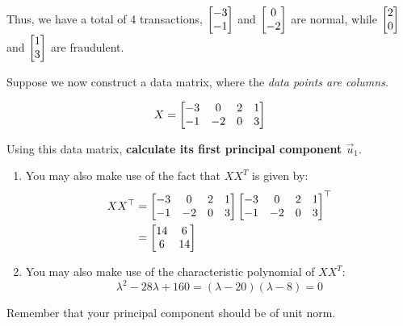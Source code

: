 	Thus, we have a total of 4 transactions, $\begin{bmatrix}-3 \\ -1\end{bmatrix}$ and $\begin{bmatrix}0 \\ -2\end{bmatrix}$ are normal, while $\begin{bmatrix}2 \\ 0\end{bmatrix}$ and $\begin{bmatrix}1 \\ 3\end{bmatrix}$ are fraudulent.
	\begin{enumerate}
		
		\qitem Suppose we now construct a data matrix, where the \textit{data points are columns}. 

			\begin{equation}
				X = \begin{bmatrix}-3 & 0 & 2 & 1 \\ -1 & -2 & 0 & 3\end{bmatrix}
			\end{equation}

			Using this data matrix, \textbf{calculate its first principal component $\vec{u}_1$}.

			\begin{hint}
			\begin{enumerate}

				\item You may also make use of the fact that $XX^T$ is given by:
				\begin{align}
					XX^{\top} &= \begin{bmatrix}-3 & 0 & 2 & 1 \\ -1 & -2 & 0 & 3\end{bmatrix}\begin{bmatrix}-3 & 0 & 2 & 1 \\ -1 & -2 & 0 & 3\end{bmatrix}^{\top} \\
						&= \begin{bmatrix}14 & 6 \\ 6 & 14\end{bmatrix}
				\end{align}
				\item You may also make use of the characteristic polynomial of $XX^T$:
				\begin{equation}
					\lambda^2 - 28\lambda + 160 = (\lambda - 20)(\lambda - 8) = 0
				\end{equation}
			\end{enumerate}
			\end{hint}
			
			\begin{hint} Remember that your principal component should be of unit norm. \end{hint}

		\ans{

}
\end{enumerate}
